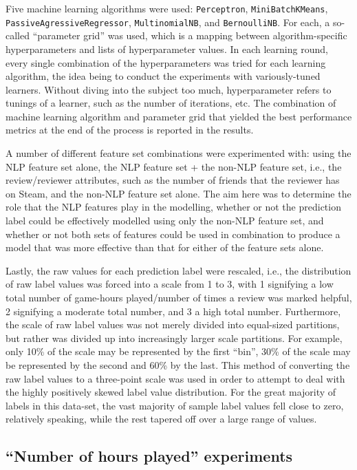 \documentclass[9pt]{article}
\begin{document}
Five machine learning algorithms were used: {\tt Perceptron}, {\tt MiniBatchKMeans}, {\tt PassiveAgressiveRegressor}, {\tt MultinomialNB}, and {\tt BernoulliNB}. For each, a so-called ``parameter grid'' was used, which is a mapping between algorithm-specific hyperparameters and lists of hyperparameter values. In each learning round, every single combination of the hyperparameters was tried for each learning algorithm, the idea being to conduct the experiments with variously-tuned learners. Without diving into the subject too much, hyperparameter refers to tunings of a learner, such as the number of iterations, etc. The combination of machine learning algorithm and parameter grid that yielded the best performance metrics at the end of the process is reported in the results.

A number of different feature set combinations were experimented with: using the NLP feature set alone, the NLP feature set + the non-NLP feature set, i.e., the review/reviewer attributes, such as the number of friends that the reviewer has on Steam, and the non-NLP feature set alone. The aim here was to determine the role that the NLP features play in the modelling, whether or not the prediction label could be effectively modelled using only the non-NLP feature set, and whether or not both sets of features could be used in combination to produce a model that was more effective than that for either of the feature sets alone.

Lastly, the raw values for each prediction label were rescaled, i.e., the distribution of raw label values was forced into a scale from 1 to 3, with 1 signifying a low total number of game-hours played/number of times a review was marked helpful, 2 signifying a moderate total number, and 3 a high total number. Furthermore, the scale of raw label values was not merely divided into equal-sized partitions, but rather was divided up into increasingly larger scale partitions. For example, only 10\% of the scale may be represented by the first ``bin'', 30\% of the scale may be represented by the second and 60\% by the last. This method of converting the raw label values to a three-point scale was used in order to attempt to deal with the highly positively skewed label value distribution. For the great majority of labels in this data-set, the vast majority of sample label values fell close to zero, relatively speaking, while the rest tapered off over a large range of values.

\subsection{``Number of hours played'' experiments}
\label{ssec:hours_played}
\end{document}
